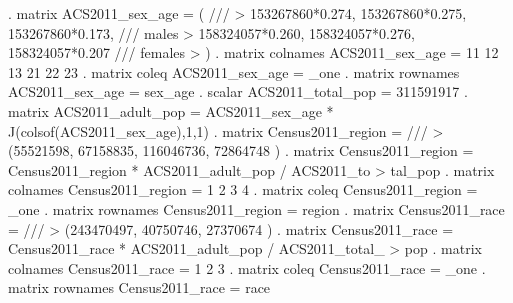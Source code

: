 . matrix ACS2011_sex_age = ( ///
>     153267860*0.274, 153267860*0.275, 153267860*0.173, /// males
>     158324057*0.260, 158324057*0.276, 158324057*0.207  /// females
> )
{\smallskip}
. matrix colnames ACS2011_sex_age = 11 12 13 21 22 23
{\smallskip}
. matrix coleq    ACS2011_sex_age = _one
{\smallskip}
. matrix rownames ACS2011_sex_age = sex_age
{\smallskip}
. scalar ACS2011_total_pop = 311591917
{\smallskip}
. matrix ACS2011_adult_pop = ACS2011_sex_age * J(colsof(ACS2011_sex_age),1,1)
{\smallskip}
\cnp
. matrix Census2011_region = ///
>     (55521598, 67158835, 116046736, 72864748 )
{\smallskip}
. matrix Census2011_region = Census2011_region * ACS2011_adult_pop / ACS2011_to
> tal_pop
{\smallskip}
. matrix colnames Census2011_region = 1 2 3 4
{\smallskip}
. matrix coleq    Census2011_region = _one
{\smallskip}
. matrix rownames Census2011_region = region
{\smallskip}
. matrix Census2011_race = ///
>     (243470497, 40750746, 27370674 )
{\smallskip}
. matrix Census2011_race = Census2011_race * ACS2011_adult_pop / ACS2011_total_
> pop
{\smallskip}
. matrix colnames Census2011_race = 1 2 3
{\smallskip}
. matrix coleq    Census2011_race = _one
{\smallskip}
. matrix rownames Census2011_race = race
{\smallskip}
